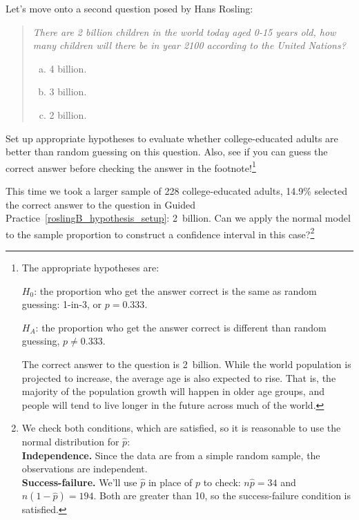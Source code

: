 \begin{exercise}\label{roslingB_hypothesis_setup}
Let's move onto a second question posed by Hans Rosling:
\begin{quote}{\em
  There are 2 billion children in the world today
  aged 0-15 years old, how many children will there
  be in year 2100 according to the United Nations?
  \begin{enumerate}[a.]
  \item 4 billion.
  \item 3 billion.
  \item 2 billion.
  \end{enumerate}
}\end{quote}
Set up appropriate hypotheses to evaluate whether
college-educated adults are better than random guessing
on this question.
Also, see if you can guess the correct answer before checking
the answer in the footnote!\footnote{%
The appropriate hypotheses are:

$H_0$: the proportion who get the answer correct is the same
as random guessing: 1-in-3, or $p = 0.333$.

$H_A$: the proportion who get the answer correct is different
than random guessing, $p \neq 0.333$.

The correct answer to the question is 2~billion.
While the world population is projected to increase,
the average age is also expected to rise.
That is, the majority of the population growth will
happen in older age groups, and people will tend to live
longer in the future across much of the world.}
\end{exercise}

\newcommand{\roslingBsize}{228}
\newcommand{\roslingBprop}{0.149}
\newcommand{\roslingBpropcomplement}{0.851}
\newcommand{\roslingBpercent}{14.9}
\newcommand{\roslingBpercentcomplement}{85.1}
\newcommand{\roslingBcount}{34}
\newcommand{\roslingBcountcomplement}{194}
\newcommand{\roslingBse}{0.024}

\begin{exercise}\label{roslingB_normality}
This time we took a larger sample of
\roslingBsize{} college-educated adults,
\roslingBpercent{}\% selected the correct answer to the
question in Guided
Practice~\ref{roslingB_hypothesis_setup}: 2~billion.
Can we apply the normal model to the sample proportion
to construct a confidence interval in this
case?\footnote{We check both conditions, which are satisfied,
so it is reasonable to use
the normal distribution for $\hat{p}$: \\
\textbf{Independence.} Since the data are from a simple
    random sample, the observations are independent. \\
\textbf{Success-failure.} We'll use $\hat{p}$ in place of $p$
    to check: $n\hat{p} = \roslingBcount$
    and $n(1 - \hat{p}) = \roslingBcountcomplement$.
    Both are greater than 10, so the success-failure condition
    is satisfied.}
\end{exercise}

